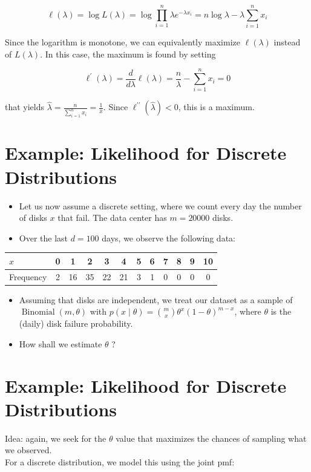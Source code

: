 \documentclass[10pt]{article}
\begin{document}
$$
\ell(\lambda)=\log L(\lambda)=\log \prod_{i=1}^{n} \lambda e^{-\lambda x_{i}}=n \log \lambda-\lambda \sum_{i=1}^{n} x_{i}
$$

Since the logarithm is monotone, we can equivalently maximize $\ell(\lambda)$ instead of $L(\lambda)$. In this case, the maximum is found by setting

$$
\ell^{\prime}(\lambda)=\frac{d}{d \lambda} \ell(\lambda)=\frac{n}{\lambda}-\sum_{i=1}^{n} x_{i}=0
$$

that yields $\widehat{\lambda}=\frac{n}{\sum_{i=1}^{n} x_{i}}=\frac{1}{\bar{x}}$. Since $\ell^{\prime \prime}(\widehat{\lambda})<0$, this is a maximum.

\section*{Example: Likelihood for Discrete Distributions}
\begin{itemize}
  \item Let us now assume a discrete setting, where we count every day the number of disks $x$ that fail. The data center has $m=20000$ disks.
  \item Over the last $d=100$ days, we observe the following data:
\end{itemize}

\begin{center}
\begin{tabular}{|l|c|c|c|c|c|c|c|c|c|c|c|}
$x$ & 0 & 1 & 2 & 3 & 4 & 5 & 6 & 7 & 8 & 9 & 10 \\
\hline
Frequency & 2 & 16 & 35 & 22 & 21 & 3 & 1 & 0 & 0 & 0 & 0 \\
\hline
\end{tabular}
\end{center}

\begin{itemize}
  \item Assuming that disks are independent, we treat our dataset as a sample of $\operatorname{Binomial}(m, \theta)$ with $p(x \mid \theta)=\binom{m}{x} \theta^{x}(1-\theta)^{m-x}$, where $\theta$ is the (daily) disk failure probability.
  \item How shall we estimate $\theta$ ?
\end{itemize}

\section*{Example: Likelihood for Discrete Distributions}
Idea: again, we seek for the $\theta$ value that maximizes the chances of sampling what we observed.\\
For a discrete distribution, we model this using the joint pmf:
\end{document}
